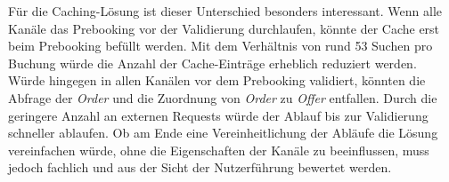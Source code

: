 Für die Caching-Lösung ist dieser Unterschied besonders interessant. Wenn alle Kanäle das Prebooking vor der Validierung durchlaufen, könnte der Cache erst beim Prebooking befüllt werden. Mit dem Verhältnis von rund 53 Suchen pro Buchung würde die Anzahl der Cache-Einträge erheblich reduziert werden. Würde hingegen in allen Kanälen vor dem Prebooking validiert, könnten die Abfrage der \textit{Order} und die Zuordnung von \textit{Order} zu \textit{Offer} entfallen. Durch die geringere Anzahl an externen Requests würde der Ablauf bis zur Validierung schneller ablaufen. Ob am Ende eine Vereinheitlichung der Abläufe die Lösung vereinfachen würde, ohne die Eigenschaften der Kanäle zu beeinflussen, muss jedoch fachlich und aus der Sicht der Nutzerführung bewertet werden.
